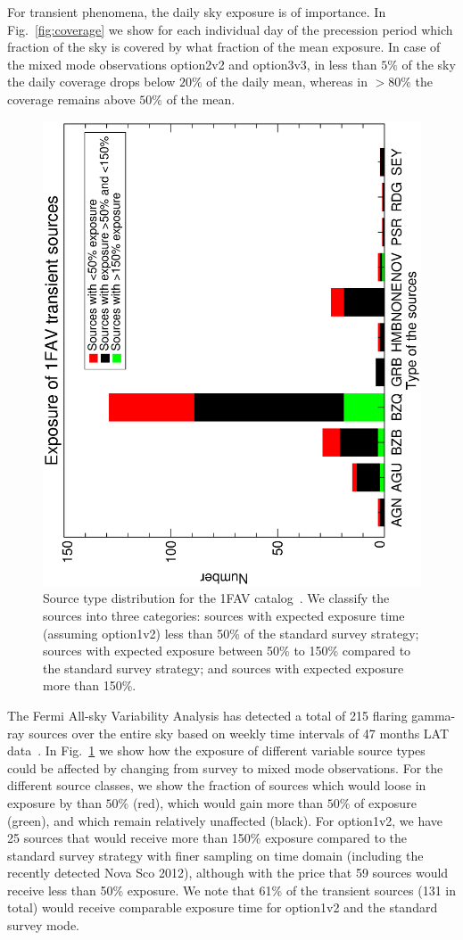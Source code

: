 \documentclass[aps,prd,superscriptaddress,nofootinbib,fixlfloat, 12pt]{revtex4-1}
\begin{document}
For transient phenomena, the daily sky exposure is of importance. In 
Fig.~\ref{fig:coverage} we show for each individual day of the precession
period which fraction of the sky is covered by what fraction of the mean
exposure. In case of the mixed mode observations option2v2 and option3v3, in
less than $5\%$ of the sky the daily coverage drops below $20\%$ of the daily
mean, whereas in $>80\%$ the coverage remains above $50\%$ of the mean.

\begin{figure}[t]
  \begin{center}
    \includegraphics[width=0.7\linewidth, angle=-90]{plots/source_type_hist.ps}
    \vspace{-0.5cm}
  \end{center}
  \caption{Source type distribution for the 1FAV
    catalog~\cite{Fermi-LAT:2013jsa}. We classify the sources into three
    categories: sources with expected exposure time (assuming option1v2) less than 50\% of the standard survey strategy; sources with expected exposure between 50\% to 150\% compared to the standard survey strategy; and sources with expected exposure more than 150\%. }
  \label{fig:transhist}
\end{figure}

The Fermi All-sky Variability Analysis has detected a total
of 215 flaring gamma-ray sources over the entire sky based
on weekly time intervals of 47 months LAT
data~\cite{Fermi-LAT:2013jsa}. In Fig.~\ref{fig:transhist} we show
how the exposure of different variable source types could be
affected by changing from survey to mixed mode
observations. For the different source classes, we show the
fraction of sources which would loose in exposure by than
$50\%$ (red), which would gain more than $50\%$ of exposure
(green), and which remain relatively unaffected (black). For
option1v2, we have 25 sources that would receive more than 150\%
exposure compared to the standard survey strategy with finer
sampling on time domain (including the recently detected
Nova Sco 2012), although with the price that 59 sources
would receive less than 50\% exposure. We note that 61\% of
the transient sources (131 in total) would receive
comparable exposure time for option1v2 and the standard survey mode.
\end{document}
